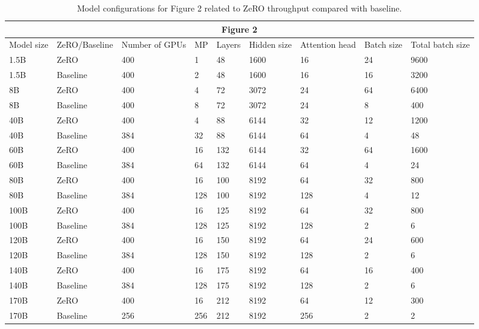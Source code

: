 \documentclass{article}
\begin{document}
\begin{table}[t!]
\scriptsize
\begin{tabular}{|l|l|l|l|l|l|l|l|l|}
\hline
\multicolumn{9}{|c|}{Figure 2} \\ \hline
Model size & ZeRO/Baseline & Number of GPUs & MP & Layers & Hidden size & Attention head & Batch size & Total batch size \\ \hline
1.5B & ZeRO & 400 & 1 & 48 & 1600 & 16 & 24 & 9600 \\ \hline
1.5B & Baseline & 400 & 2 & 48 & 1600 & 16 & 16 & 3200 \\ \hline
8B & ZeRO & 400 & 4 & 72 & 3072 & 24 & 64 & 6400 \\ \hline
8B & Baseline & 400 & 8 & 72 & 3072 & 24 & 8 & 400 \\ \hline
40B & ZeRO & 400 & 4 & 88 & 6144 & 32 & 12 & 1200 \\ \hline
40B & Baseline & 384 & 32 & 88 & 6144 & 64 & 4 & 48 \\ \hline
60B & ZeRO & 400 & 16 & 132 & 6144 & 32 & 64 & 1600 \\ \hline
60B & Baseline & 384 & 64 & 132 & 6144 & 64 & 4 & 24 \\ \hline
80B & ZeRO & 400 & 16 & 100 & 8192 & 64 & 32 & 800 \\ \hline
80B & Baseline & 384 & 128 & 100 & 8192 & 128 & 4 & 12 \\ \hline
100B & ZeRO & 400 & 16 & 125 & 8192 & 64 & 32 & 800 \\ \hline
100B & Baseline & 384 & 128 & 125 & 8192 & 128 & 2 & 6 \\ \hline
120B & ZeRO & 400 & 16 & 150 & 8192 & 64 & 24 & 600 \\ \hline
120B & Baseline & 384 & 128 & 150 & 8192 & 128 & 2 & 6 \\ \hline
140B & ZeRO & 400 & 16 & 175 & 8192 & 64 & 16 & 400 \\ \hline
140B & Baseline & 384 & 128 & 175 & 8192 & 128 & 2 & 6 \\ \hline
170B & ZeRO & 400 & 16 & 212 & 8192 & 64 & 12 & 300 \\ \hline
170B & Baseline & 256 & 256 & 212 & 8192 & 256 & 2 & 2 \\ \hline
\end{tabular}
\caption{Model configurations for Figure 2 related to ZeRO throughput compared with baseline.} \label{tab:fig2-tab}
\end{table}
\end{document}
